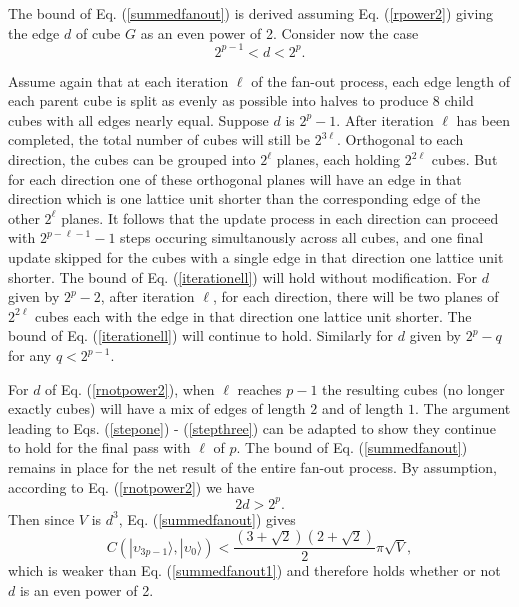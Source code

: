 \documentclass[twocolumn,amsmath,amssymb]{revtex4-1}
\begin{document}
The bound of Eq. (\ref{summedfanout}) is derived assuming Eq. (\ref{rpower2}) giving the edge $d$ of cube $G$ 
as an even power of 2. Consider now the case
\begin{equation}
\label{rnotpower2}
2^{p-1} < d < 2^p.
\end{equation}

Assume again that at each iteration $\ell$ of the fan-out process, each edge length of each parent cube is
split as evenly as possible into halves to produce 8 child cubes with all edges nearly equal. Suppose
$d$ is $2^p - 1$. After iteration $\ell$ has been completed, the total number
of cubes will still be $2^{3 \ell}$. Orthogonal to each direction, the cubes can be grouped
into $2^\ell$ planes, each holding $2^{2 \ell}$ cubes. But for each direction one of these
orthogonal planes will have an edge in that direction which is one lattice unit shorter than the 
corresponding edge of the other $2^\ell$ planes. It follows that the update process in
each direction can proceed with $2^{p - \ell - 1} - 1$ steps occuring simultanously across all
cubes, and one final update skipped for the cubes with a single edge in that direction one
lattice unit shorter. The bound of Eq. (\ref{iterationell}) will hold without modification.
For $d$ given by  $2^p - 2$, after iteration $\ell$, for each direction, there will be two planes of
$2^{2 \ell}$ cubes each with the edge in that direction one lattice unit shorter. The bound of
Eq. (\ref{iterationell}) will continue to hold. Similarly for $d$ given  by $2^p - q$ for any
$q < 2^{p-1}$. 

For $d$ of Eq. (\ref{rnotpower2}), when $\ell$ reaches $p - 1$ the resulting cubes (no longer exactly cubes)
will have a mix of edges of length $2$ and of length $1$. The argument leading to Eqs. (\ref{stepone}) - (\ref{stepthree})
can be adapted to show they continue to hold for the final pass with $\ell$
of $p$. The bound of Eq. (\ref{summedfanout}) remains in place for the net result of the entire
fan-out process. By assumption, according to Eq. (\ref{rnotpower2}) we have
\begin{equation}
\label{rbound}
2 d > 2^p.
\end{equation}
Then since $V$ is $d^3$, Eq. (\ref{summedfanout}) gives
\begin{equation}
\label{summedfanout2}
C(|\upsilon_{3p-1} \rangle , |\upsilon_0 \rangle ) < \frac{(3 + \sqrt{2})(2 + \sqrt{2})}{2} \pi  \sqrt{V},
\end{equation}
which is weaker than Eq. (\ref{summedfanout1}) and therefore holds whether or not
$d$ is an even power of 2.
\end{document}
